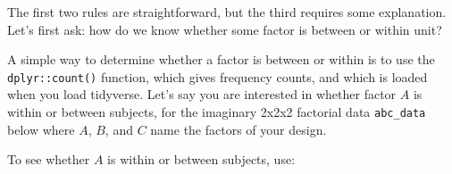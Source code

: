 \documentclass[]{book}
\newenvironment{Shaded}{\begin{snugshade}}{\end{snugshade}}
\newcommand{\CommentTok}[1]{\textcolor[rgb]{0.56,0.35,0.01}{\textit{#1}}}
\newcommand{\DataTypeTok}[1]{\textcolor[rgb]{0.13,0.29,0.53}{#1}}
\newcommand{\DecValTok}[1]{\textcolor[rgb]{0.00,0.00,0.81}{#1}}
\newcommand{\KeywordTok}[1]{\textcolor[rgb]{0.13,0.29,0.53}{\textbf{#1}}}
\newcommand{\NormalTok}[1]{#1}
\newcommand{\OperatorTok}[1]{\textcolor[rgb]{0.81,0.36,0.00}{\textbf{#1}}}
\newcommand{\StringTok}[1]{\textcolor[rgb]{0.31,0.60,0.02}{#1}}
\begin{document}
The first two rules are straightforward, but the third requires some explanation. Let's first ask: how do we know whether some factor is between or within unit?

A simple way to determine whether a factor is between or within is to use the \texttt{dplyr::count()} function, which gives frequency counts, and which is loaded when you load tidyverse. Let's say you are interested in whether factor \(A\) is within or between subjects, for the imaginary 2x2x2 factorial data \texttt{abc\_data} below where \(A\), \(B\), and \(C\) name the factors of your design.

\begin{Shaded}
\end{Shaded}

To see whether \(A\) is within or between subjects, use:

\begin{Shaded}
\end{Shaded}
\end{document}
